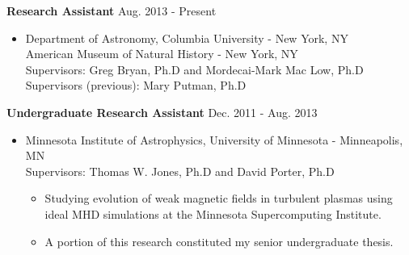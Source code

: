 \documentclass[10pt]{article}
\newenvironment{innerlist}[1][\enskip\textbullet]%
        {\begin{itemize}[#1,leftmargin=*,parsep=0pt,itemsep=0pt,topsep=0pt,partopsep=0pt]}
        {\end{itemize}}
\begin{document}
\textbf{Research Assistant} \hfill {Aug. 2013 - Present}
\begin{innerlist}

\item[] Department of Astronomy, Columbia University - New York, NY\\
        American Museum of Natural History - New York, NY\\
    Supervisors: Greg Bryan, Ph.D and Mordecai-Mark Mac Low, Ph.D\\
		Supervisors (previous): Mary Putman, Ph.D
\end{innerlist}

\iflong
\textbf{Undergraduate Research Assistant} \hfill {Dec. 2011 - Aug. 2013}
\begin{innerlist}

\item[] Minnesota Institute of Astrophysics, University of Minnesota - Minneapolis, MN\\
		Supervisors: Thomas W. Jones, Ph.D and David Porter, Ph.D
		\iflong
		\begin{innerlist}
		\item Studying evolution of weak magnetic fields in turbulent plasmas using
		ideal MHD simulations at the Minnesota Supercomputing Institute.
		\item A portion of this research constituted my senior undergraduate thesis.
		\end{innerlist}
		\fi
\end{innerlist}
\end{document}
